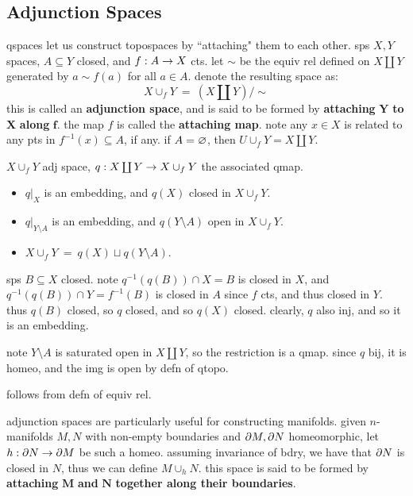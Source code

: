 \subsection{Adjunction Spaces}
qspaces let us construct topospaces by ``attaching" them to each other. sps
$X,Y$ spaces, $A\subseteq Y$ closed, and $f:A\rightarrow X$ cts. let $\sim$ be the equiv
rel defined on $X\coprod Y$ generated by $a\sim f(a)$ for all $a \in A$. denote
the resulting space as:
\begin{equation*}
    X \cup_{f} Y \ = \ (X \coprod Y)/\sim
\end{equation*}
this is called an \textbf{adjunction space}, and is said to be formed by
\textbf{attaching} $\bm{Y}$ \textbf{to} $\bm{X}$ \textbf{along} $\bm{f}$. the map
$f$ is called the \textbf{attaching map}. note any $x\in X$ is related to any pts
in $f^{-1}(x) \subseteq A$, if any. if $A=\varnothing$, then $U\cup_{f} Y=X\coprod Y$.

\begin{prop}
    $X \cup_{f} Y$ adj space, $q:X\coprod Y\rightarrow X\cup_{f}Y$ the associated qmap.
    \begin{itemize}
        \item $q\rvert_{X}$ is an embedding, and $q(X)$ closed in $X\cup_{f}Y$.
        \item $q\rvert_{Y\setminus A}$ is an embedding, and $q(Y\setminus A)$
            open in $X\cup_{f}Y$.
        \item $X\cup_{f}Y \ = \ q(X) \sqcup q(Y\setminus A)$.
    \end{itemize}
\end{prop}

\begin{pf}[source=Primary Source Material]
    sps $B\subseteq X$ closed. note $q^{-1}(q(B))\cap X = B$ is closed in $X$,
    and $q^{-1}(q(B))\cap Y = f^{-1}(B)$ is closed in $A$ since $f$ cts, and thus
    closed in $Y$. thus $q(B)$ closed, so $q$ closed, and so $q(X)$ closed.
    clearly, $q$ also inj, and so it is an embedding.

    note $Y\setminus A$ is saturated open in $X\coprod Y$, so the restriction is
    a qmap. since $q$ bij, it is homeo, and the img is open by defn of qtopo.

    follows from defn of equiv rel.
\end{pf}

adjunction spaces are particularly useful for constructing manifolds. given
$n$-manifolds $M, N$ with non-empty boundaries and $\partial M, \partial N$ homeomorphic, let
$h:\partial N \rightarrow \partial M$ be such a homeo. assuming invariance of bdry, we have that
$\partial N$ is closed in $N$, thus we can define $M\cup_{h}N$. this space is said to
be formed by \textbf{attaching} $\bm{M}$ \textbf{and} $\bm{N}$ \textbf{together
along their boundaries}.

